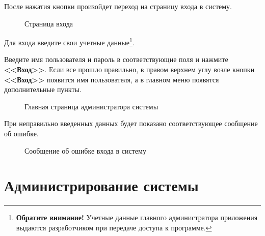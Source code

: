 \documentclass[a4paper]{article}
\begin{document}
После нажатия кнопки произойдет переход на страницу входа в систему.

\begin{figure}[h]
\caption{Страница входа}
\label{fig:image5}
\end{figure}

Для входа введите свои учетные данные\footnote{\textbf{Обратите внимание!} Учетные данные главного администратора приложения выдаются разработчиком при передаче доступа к программе.}.

Введите имя пользователя и пароль в соответствующие поля и нажмите \textbf{<<Вход>>}. Если все прошло правильно, в правом верхнем углу возле кнопки \textbf{<<Вход>>} появится имя пользователя, а в главном меню появятся дополнительные пункты.

\begin{figure}[h]
\caption{Главная страница администратора системы}
\label{fig:image6}
\end{figure}

При неправильно введенных данных будет показано соответствующее сообщение об ошибке.

\begin{figure}[h]
\caption{Сообщение об ошибке входа в систему}
\label{fig:image7}
\end{figure}

\section{Администрирование системы}
\end{document}
